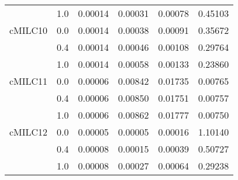 \begin{longtable}{cccccc}
     & 1.0 & 0.00014 & 0.00031 & 0.00078 & 0.45103 \\
cMILC10 & 0.0 & 0.00014 & 0.00038 & 0.00091 & 0.35672 \\
     & 0.4 & 0.00014 & 0.00046 & 0.00108 & 0.29764 \\
     & 1.0 & 0.00014 & 0.00058 & 0.00133 & 0.23860 \\
cMILC11 & 0.0 & 0.00006 & 0.00842 & 0.01735 & 0.00765 \\
     & 0.4 & 0.00006 & 0.00850 & 0.01751 & 0.00757 \\
     & 1.0 & 0.00006 & 0.00862 & 0.01777 & 0.00750 \\
cMILC12 & 0.0 & 0.00005 & 0.00005 & 0.00016 & 1.10140 \\
     & 0.4 & 0.00008 & 0.00015 & 0.00039 & 0.50727 \\
     & 1.0 & 0.00008 & 0.00027 & 0.00064 & 0.29238 \\
\end{longtable}
